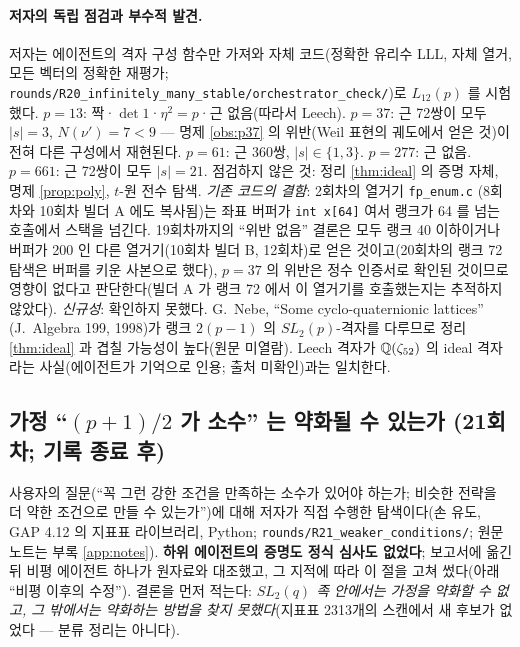 \paragraph{저자의 독립 점검과 부수적 발견.} 저자는 에이전트의 격자 구성 함수만 가져와 자체 코드(정확한 유리수 LLL, 자체 열거, 모든 벡터의 정확한 재평가; \texttt{rounds/R20\_infinitely\_many\_stable/orchestrator\_check/})로 $L_{12}(p)$ 를 시험했다. $p=13$: 짝·$\det1$·$\eta^2=p$·근 없음(따라서 Leech). $p=37$: 근 72쌍이 모두 $|s|=3$, $N(\nu')=7<9$ --- 명제 \ref{obs:p37} 의 위반(Weil 표현의 궤도에서 얻은 것)이 전혀 다른 구성에서 재현된다. $p=61$: 근 360쌍, $|s|\in\{1,3\}$. $p=277$: 근 없음. $p=661$: 근 72쌍이 모두 $|s|=21$. 점검하지 않은 것: 정리 \ref{thm:ideal} 의 증명 자체, 명제 \ref{prop:poly}, $t$-원 전수 탐색. \emph{기존 코드의 결함}: 2회차의 열거기 \texttt{fp\_enum.c} (8회차와 10회차 빌더 A 에도 복사됨)는 좌표 버퍼가 \texttt{int x[64]} 여서 랭크가 64 를 넘는 호출에서 스택을 넘긴다. 19회차까지의 ``위반 없음'' 결론은 모두 랭크 40 이하이거나 버퍼가 200 인 다른 열거기(10회차 빌더 B, 12회차)로 얻은 것이고(20회차의 랭크 72 탐색은 버퍼를 키운 사본으로 했다), $p=37$ 의 위반은 정수 인증서로 확인된 것이므로 영향이 없다고 판단한다(빌더 A 가 랭크 72 에서 이 열거기를 호출했는지는 추적하지 않았다). \emph{신규성}: 확인하지 못했다. G.\ Nebe, ``Some cyclo-quaternionic lattices'' (J.\ Algebra 199, 1998)가 랭크 $2(p-1)$ 의 $SL_2(p)$-격자를 다루므로 정리 \ref{thm:ideal} 과 겹칠 가능성이 높다(원문 미열람). Leech 격자가 $\mathbb{Q}(\zeta_{52})$ 의 ideal 격자라는 사실(에이전트가 기억으로 인용; 출처 미확인)과는 일치한다.

\subsection{가정 ``$(p+1)/2$ 가 소수'' 는 약화될 수 있는가 (21회차; 기록 종료 후)}\label{sec:r21}
사용자의 질문(``꼭 그런 강한 조건을 만족하는 소수가 있어야 하는가; 비슷한 전략을 더 약한 조건으로 만들 수 있는가'')에 대해 저자가 직접 수행한 탐색이다(손 유도, GAP 4.12 의 지표표 라이브러리, Python; \texttt{rounds/R21\_weaker\_conditions/}; 원문 노트는 부록 \ref{app:notes}). \textbf{하위 에이전트의 증명도 정식 심사도 없었다}; 보고서에 옮긴 뒤 비평 에이전트 하나가 원자료와 대조했고, 그 지적에 따라 이 절을 고쳐 썼다(아래 ``비평 이후의 수정''). 결론을 먼저 적는다: \emph{$SL_2(q)$ 족 안에서는 가정을 약화할 수 없고, 그 밖에서는 약화하는 방법을 찾지 못했다}(지표표 2313개의 스캔에서 새 후보가 없었다 --- 분류 정리는 아니다).

